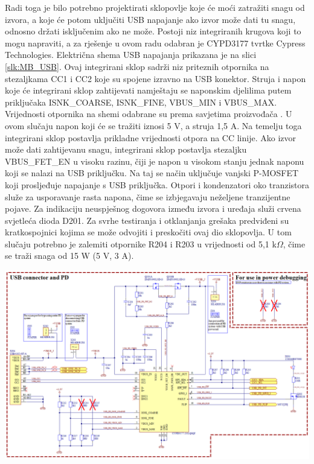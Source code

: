 Radi toga je bilo potrebno projektirati sklopovlje koje će moći zatražiti snagu od izvora, a koje će potom uključiti USB napajanje ako izvor može dati tu snagu, odnosno držati isključenim ako ne može. Postoji niz integriranih krugova koji to mogu napraviti, a za rješenje u ovom radu odabran je CYPD3177 tvrtke Cypress Technologies. Električna shema USB napajanja prikazana je na slici \ref{slk:MB_USB}. Ovaj integrirani sklop sadrži niz priteznih otpornika na stezaljkama CC1 i CC2 koje su spojene izravno na USB konektor. Struja i napon koje će integrirani sklop zahtijevati namještaju se naponskim djelilima putem priključaka ISNK\_COARSE, ISNK\_FINE, VBUS\_MIN i VBUS\_MAX. Vrijednosti otpornika na shemi odabrane su prema savjetima proizvođača \cite{ct:usb}. U ovom slučaju napon koji će se tražiti iznosi 5 V, a struja 1,5 A. Na temelju toga integrirani sklop postavlja prikladne vrijednosti otpora na CC linije. Ako izvor može dati zahtijevanu snagu, integrirani sklop postavlja stezaljku VBUS\_FET\_EN u visoku razinu, čiji je napon u visokom stanju jednak naponu koji se nalazi na USB priključku. Na taj se način uključuje vanjski P-MOSFET koji prosljeđuje napajanje s USB priključka. Otpori i kondenzatori oko tranzistora služe za usporavanje rasta napona, čime se izbjegavaju neželjene tranzijentne pojave. Za indikaciju neuspješnog dogovora između izvora i uređaja služi crvena svjetleća dioda D201. Za svrhe testiranja i otklanjanja grešaka predviđeni su kratkospojnici kojima se može odvojiti i preskočiti ovaj dio sklopovlja. U tom slučaju potrebno je zalemiti otpornike R204 i R203 u vrijednosti od 5,1 k$\Omega$, čime se traži snaga od 15 W (5 V, 3 A).
\begin{center}
    \begin{sideways}
        \begin{minipage}{1.2\linewidth}
            \includegraphics[width=\linewidth]{Figures/MB_USB.png}
            \label{slk:MB_USB}
        \end{minipage}
    \end{sideways}
\end{center}

